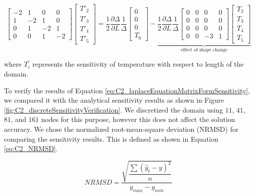 \begin{equation}\label{eq:C2_laplaceEquationMatrixFormSensitivity}
	\begin{bmatrix}
		-2 & 1 & 0 & 0 \\
		1 & -2 & 1 & 0 \\
		0 & 1 & -2 & 1 \\
		0 & 0 & 1 & -2
	\end{bmatrix}
	\begin{bmatrix}
		T'_2 \\
		T'_3 \\
		T'_4 \\
		T'_5
	\end{bmatrix}
	=
	\frac{1}{2} \frac{\partial \Delta}{\partial L} \frac{1}{\Delta}
	\begin{bmatrix}
		0 \\
		0 \\
		0 \\
		T_6
	\end{bmatrix}
	-
	\underbrace{
	\frac{1}{2} \frac{\partial \Delta}{\partial L} \frac{1}{\Delta}
	\begin{bmatrix}
		0 & 0 & 0 & 0 \\
		0 & 0 & 0 & 0 \\
		0 & 0 & 0 & 0 \\
		0 & 0 & -3 & 1
	\end{bmatrix}
	\begin{bmatrix}
		T_2 \\
		T_3 \\
		T_4 \\
		T_5
	\end{bmatrix}}_\text{effect of shape change}
\end{equation}

where $T^\prime_i$ represents the sensitivity of temperature with respect to length of the domain.

To verify the results of Equation \eqref{eq:C2_laplaceEquationMatrixFormSensitivity}, we compared it with the analytical sensitivity results as shown in Figure \ref{fig:C2_discreteSensitivityVerification}. We discretized the domain using $11$, $41$, $81$, and $161$ nodes for this purpose, however this does not affect the solution accuracy. We chose the normalized root-mean-square deviation (NRMSD) for comparing the sensitivity results. This is defined as shown in Equation \eqref{eq:C2_NRMSD}.

\begin{equation}\label{eq:C2_NRMSD}
	NRMSD = \dfrac{\sqrt{\dfrac{\sum (\hat{y}_t - y)^2}{n}}}{y_{max} - y_{min}}
\end{equation}

